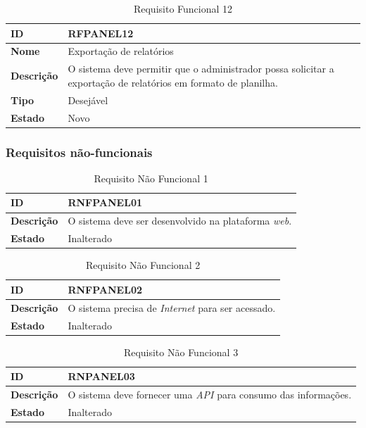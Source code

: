 \begin{table}[H]
\centering
\begin{tabular}{|l|p{12cm}|}
\hline
\textbf{ID} & RFPANEL12 \\
\hline
\textbf{Nome} & Exportação de relatórios \\
\hline
\textbf{Descrição} & O sistema deve permitir que o administrador possa solicitar a exportação de relatórios em formato de planilha. \\
\hline
\textbf{Tipo} & Desejável \\
\hline
\textbf{Estado} & Novo \\
\hline
\end{tabular}
\caption[RFPANEL12 -- Exportação de relatórios]{Requisito Funcional 12}
\label{tab:rfpanel12}
\end{table}


\subsubsection{Requisitos não-funcionais}

\begin{table}[H]
\centering
\begin{tabular}{|l|p{12cm}|}
\hline
\textbf{ID} & RNFPANEL01 \\
\hline
\textbf{Descrição} & O sistema deve ser desenvolvido na plataforma \emph{web}. \\
\hline
\textbf{Estado} & Inalterado \\
\hline
\end{tabular}
\caption[RNFPANEL01 -- Desenvolvimento em plataforma web]{Requisito Não Funcional 1}
\label{tab:rnfpanel01}
\end{table}

\begin{table}[H]
\centering
\begin{tabular}{|l|p{12cm}|}
\hline
\textbf{ID} & RNFPANEL02 \\
\hline
\textbf{Descrição} & O sistema precisa de \emph{Internet} para ser acessado. \\
\hline
\textbf{Estado} & Inalterado \\
\hline
\end{tabular}
\caption[RNFPANEL02 -- Acesso pela Internet]{Requisito Não Funcional 2}
\label{tab:rnfpanel02}
\end{table}

\begin{table}[H]
\centering
\begin{tabular}{|l|p{12cm}|}
\hline
\textbf{ID} & RNPANEL03 \\
\hline
\textbf{Descrição} & O sistema deve fornecer uma \emph{API} para consumo das informações. \\
\hline
\textbf{Estado} & Inalterado \\
\hline
\end{tabular}
\caption[RNPANEL03 -- Fornecimento de API para consumo das informações]{Requisito Não Funcional 3}
\label{tab:rnfpanel03}
\end{table}

